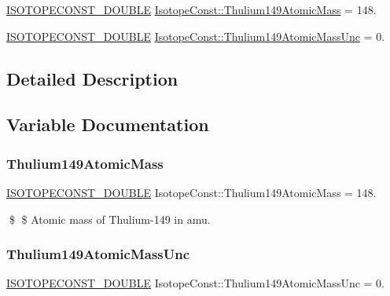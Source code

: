 \begin{DoxyCompactItemize}
\item 
\mbox{\hyperlink{group___isotope_const-_macros_ga8f45a7272ce02c0b4c65c44636ed719a}{I\+S\+O\+T\+O\+P\+E\+C\+O\+N\+S\+T\+\_\+\+D\+O\+U\+B\+LE}} \mbox{\hyperlink{group___isotope_const-_thulium-_tm149_gada168c6bbbfedd1fe96d8bfe19064508}{Isotope\+Const\+::\+Thulium149\+Atomic\+Mass}} = 148.
\item 
\mbox{\hyperlink{group___isotope_const-_macros_ga8f45a7272ce02c0b4c65c44636ed719a}{I\+S\+O\+T\+O\+P\+E\+C\+O\+N\+S\+T\+\_\+\+D\+O\+U\+B\+LE}} \mbox{\hyperlink{group___isotope_const-_thulium-_tm149_gaddc0947beb518a3bf9fcb420996309dc}{Isotope\+Const\+::\+Thulium149\+Atomic\+Mass\+Unc}} = 0.
\end{DoxyCompactItemize}


\subsection{Detailed Description}


\subsection{Variable Documentation}
\mbox{\label{group___isotope_const-_thulium-_tm149_gada168c6bbbfedd1fe96d8bfe19064508}} 
\subsubsection{\texorpdfstring{Thulium149\+Atomic\+Mass}{Thulium149AtomicMass}}
{\footnotesize\ttfamily \mbox{\hyperlink{group___isotope_const-_macros_ga8f45a7272ce02c0b4c65c44636ed719a}{I\+S\+O\+T\+O\+P\+E\+C\+O\+N\+S\+T\+\_\+\+D\+O\+U\+B\+LE}} Isotope\+Const\+::\+Thulium149\+Atomic\+Mass = 148.}

\$ \$ Atomic mass of Thulium-\/149 in amu. \mbox{\label{group___isotope_const-_thulium-_tm149_gaddc0947beb518a3bf9fcb420996309dc}} 
\subsubsection{\texorpdfstring{Thulium149\+Atomic\+Mass\+Unc}{Thulium149AtomicMassUnc}}
{\footnotesize\ttfamily \mbox{\hyperlink{group___isotope_const-_macros_ga8f45a7272ce02c0b4c65c44636ed719a}{I\+S\+O\+T\+O\+P\+E\+C\+O\+N\+S\+T\+\_\+\+D\+O\+U\+B\+LE}} Isotope\+Const\+::\+Thulium149\+Atomic\+Mass\+Unc = 0.}

